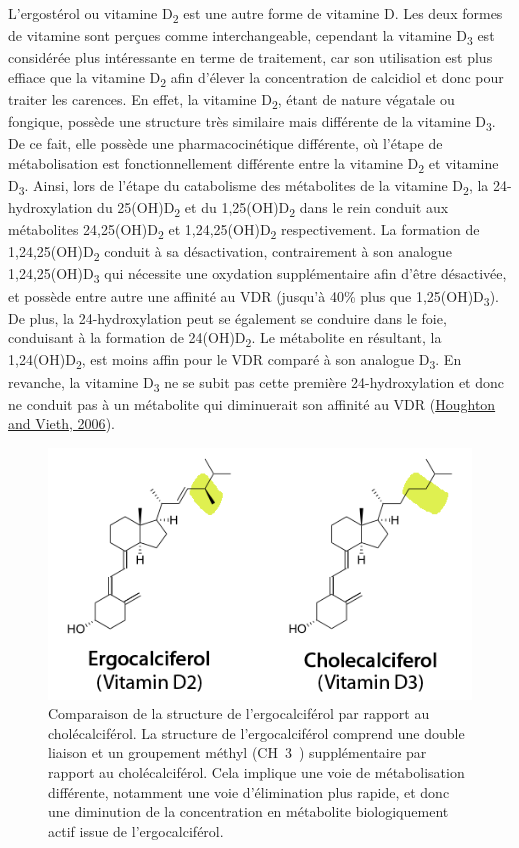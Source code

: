 \documentclass[
  a4paper,
  DIV=11,
  numbers=noendperiod,
  listof=totoc]{scrreprt}
\begin{document}
L'ergostérol ou vitamine D\textsubscript{2} est une autre forme de
vitamine D. Les deux formes de vitamine sont perçues comme
interchangeable, cependant la vitamine D\textsubscript{3} est considérée
plus intéressante en terme de traitement, car son utilisation est plus
effiace que la vitamine D\textsubscript{2} afin d'élever la
concentration de calcidiol et donc pour traiter les carences. En effet,
la vitamine D\textsubscript{2}, étant de nature végatale ou fongique,
possède une structure très similaire mais différente de la vitamine
D\textsubscript{3}. De ce fait, elle possède une pharmacocinétique
différente, où l'étape de métabolisation est fonctionnellement
différente entre la vitamine D\textsubscript{2} et vitamine
D\textsubscript{3}. Ainsi, lors de l'étape du catabolisme des
métabolites de la vitamine D\textsubscript{2}, la 24-hydroxylation du
25(OH)D\textsubscript{2} et du 1,25(OH)D\textsubscript{2} dans le rein
conduit aux métabolites 24,25(OH)D\textsubscript{2} et
1,24,25(OH)D\textsubscript{2} respectivement. La formation de
1,24,25(OH)D\textsubscript{2} conduit à sa désactivation, contrairement
à son analogue 1,24,25(OH)D\textsubscript{3} qui nécessite une oxydation
supplémentaire afin d'être désactivée, et possède entre autre une
affinité au VDR (jusqu'à 40\% plus que 1,25(OH)D\textsubscript{3}). De
plus, la 24-hydroxylation peut se également se conduire dans le foie,
conduisant à la formation de 24(OH)D\textsubscript{2}. Le métabolite en
résultant, la 1,24(OH)D\textsubscript{2}, est moins affin pour le VDR
comparé à son analogue D\textsubscript{3}. En revanche, la vitamine
D\textsubscript{3} ne se subit pas cette première 24-hydroxylation et
donc ne conduit pas à un métabolite qui diminuerait son affinité au VDR
(\protect\hyperlink{ref-Houghton.2006}{Houghton and Vieth, 2006}).

\begin{figure}
\includegraphics{figures/ergo_vs_chole.png} 
\caption[\textbf{Comparaison de la structure de l'ergocalciférol par rapport au cholécalciférol.}]{Comparaison de la structure de l'ergocalciférol par rapport au cholécalciférol. La structure de l'ergocalciférol comprend une double liaison et un groupement méthyl (CH~3~) supplémentaire par rapport au cholécalciférol. Cela implique une voie de métabolisation différente, notamment une voie d'élimination plus rapide, et donc une diminution de la concentration en métabolite biologiquement actif issue de l'ergocalciférol.}
\label{fig:ergo-struc}
\end{figure}
\end{document}

